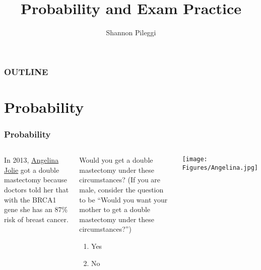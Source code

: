 





\title[Unit 1 Deck 4]{Probability and Exam Practice}
\author[Pileggi]{Shannon Pileggi}


\date{}




\begin{frame}
\titlepage
\end{frame}

\begin{frame}
\frametitle{OUTLINE\qquad\qquad\qquad} \tableofcontents[hideallsubsections]
\end{frame}



\section[Probability]{Probability}
\begin{frame}
\end{frame}

\begin{frame}
\frametitle{Probability}
\begin{columns}
In 2013, \href{http://www.nytimes.com/2013/05/14/opinion/my-medical-choice.html?_r=0}{Angelina Jolie} got a double mastectomy because doctors told her that with the BRCA1 gene she has an 87\% risk of breast cancer.
\begin{clicker}{Would you get a double mastectomy under these circumstances? (If you are male, consider the question to be ``Would you want your mother to get a double mastectomy under these circumstances?'')}
\begin{enumerate}
    \item
    Yes
    \item
    No
\end{enumerate}
\end{clicker}
\texttt{[image: Figures/Angelina.jpg]}
\end{columns}
\end{frame}




